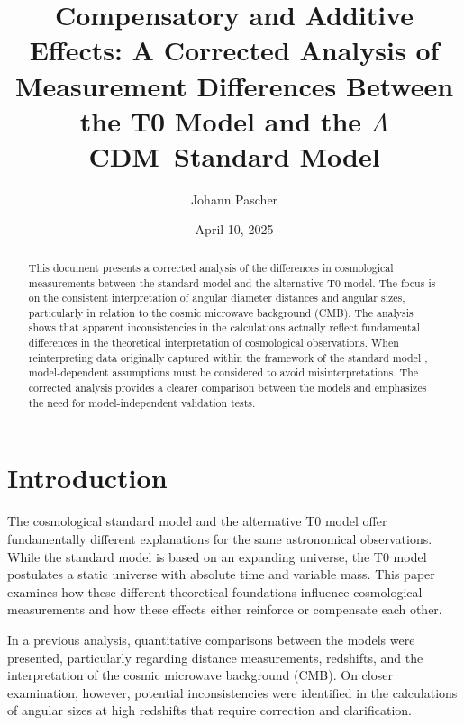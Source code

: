 \documentclass[a4paper,12pt]{article}
\newcommand{\LCDM}{\ensuremath{\Lambda}CDM}
\begin{document}
	
	\title{Compensatory and Additive Effects: A Corrected Analysis of Measurement Differences Between the T0 Model and the \LCDM\ Standard Model}
	\author{Johann Pascher}
	\date{April 10, 2025}
	\maketitle
	
	\begin{abstract}
		This document presents a corrected analysis of the differences in cosmological measurements between the standard model \cite{Planck2018} and the alternative T0 model. The focus is on the consistent interpretation of angular diameter distances and angular sizes, particularly in relation to the cosmic microwave background (CMB). The analysis shows that apparent inconsistencies in the calculations actually reflect fundamental differences in the theoretical interpretation of cosmological observations. When reinterpreting data originally captured within the framework of the standard model \cite{Planck2018}, model-dependent assumptions must be considered to avoid misinterpretations. The corrected analysis provides a clearer comparison between the models and emphasizes the need for model-independent validation tests.
	\end{abstract}
	
	\tableofcontents
	\newpage
	
	\section{Introduction}
	
	The cosmological standard model \cite{Planck2018} and the alternative T0 model offer fundamentally different explanations for the same astronomical observations. While the standard model \cite{Planck2018} is based on an expanding universe, the T0 model postulates a static universe with absolute time and variable mass. This paper examines how these different theoretical foundations influence cosmological measurements and how these effects either reinforce or compensate each other.
	
	In a previous analysis, quantitative comparisons between the models were presented, particularly regarding distance measurements, redshifts, and the interpretation of the cosmic microwave background (CMB). On closer examination, however, potential inconsistencies were identified in the calculations of angular sizes at high redshifts that require correction and clarification.
	
\end{document}

